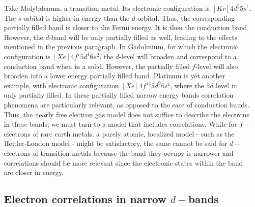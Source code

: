 \documentclass[10pt, twocolumn, twoside]{article}
\begin{document}
Take Molybdenum, a transition metal. Its electronic configuration is $[Kr] 4d^5 5s^1$. The $s$-orbital is higher in energy than the $d$-orbital. Thus, the corresponding partially filled band is closer to the Fermi energy. It is then the conduction band. However, the $d$-band will be only partially filled as well, leading to the effects mentioned in the previous paragraph. In Gadolinium, for which the electronic configuration is $[Xe] 4f^7 5d^1 6s^2$, the $d$-level will broaden and correspond to a conduction band when in a solid. However, the partially filled $f$-level will also broaden into a lower energy partially filled band. Platinum is yet another example, with electronic configuration $[Xe]4f^{14} 5d^9 6s^1 $, where the $5d$ level in only partially filled. In these partially filled narrow energy bands correlation phenomena are particularly relevant, as opposed to the case of conduction bands. Thus, the nearly free electron gas model does not suffice to describe the electrons in these bands; we must turn to a model that includes correlations. While for $f-$electrons of rare earth metals, a purely atomic, localized model - such as the Heitler-London model - might be satisfactory, the same cannot be said for $d-$electrons of transition metals because the band they occupy is narrower and correlations should be more relevant since the electronic states within the band are closer in energy.

\subsection{Electron correlations in narrow $d-$bands}\paragraph{}
\end{document}
